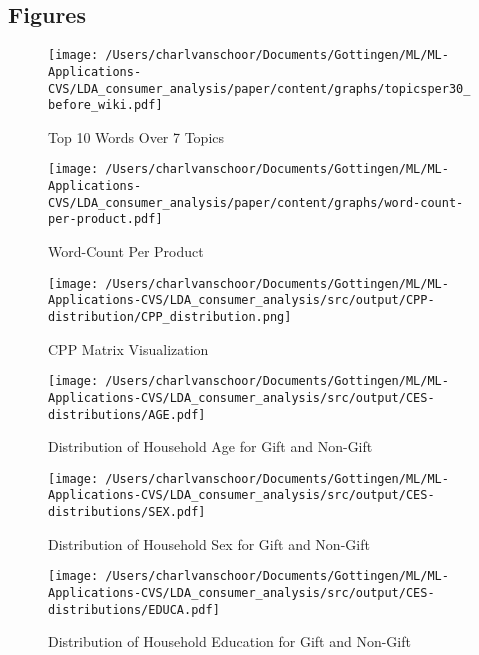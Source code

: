 \clearpage



\subsection{Figures} %
\label{sub:figures}

\begin{figure}[!h]
\caption{Top 10 Words Over 7 Topics}\centering
\texttt{[image: /Users/charlvanschoor/Documents/Gottingen/ML/ML-Applications-CVS/LDA\_consumer\_analysis/paper/content/graphs/topicsper30\_before\_wiki.pdf]}
\end{figure}
\begin{figure}
\caption{Word-Count Per Product}\centering
\texttt{[image: /Users/charlvanschoor/Documents/Gottingen/ML/ML-Applications-CVS/LDA\_consumer\_analysis/paper/content/graphs/word-count-per-product.pdf]}
\end{figure}

\begin{figure}
\caption{CPP Matrix Visualization}\centering
\texttt{[image: /Users/charlvanschoor/Documents/Gottingen/ML/ML-Applications-CVS/LDA\_consumer\_analysis/src/output/CPP-distribution/CPP\_distribution.png]}
\end{figure}



\begin{figure}
\caption{Distribution of Household Age for Gift and Non-Gift}\centering
\texttt{[image: /Users/charlvanschoor/Documents/Gottingen/ML/ML-Applications-CVS/LDA\_consumer\_analysis/src/output/CES-distributions/AGE.pdf]}
\end{figure}

\begin{figure}
\caption{Distribution of Household Sex for Gift and Non-Gift}\centering
\texttt{[image: /Users/charlvanschoor/Documents/Gottingen/ML/ML-Applications-CVS/LDA\_consumer\_analysis/src/output/CES-distributions/SEX.pdf]}
\end{figure}

\begin{figure}
\caption{Distribution of Household Education for Gift and Non-Gift}\centering
\texttt{[image: /Users/charlvanschoor/Documents/Gottingen/ML/ML-Applications-CVS/LDA\_consumer\_analysis/src/output/CES-distributions/EDUCA.pdf]}
\end{figure}

